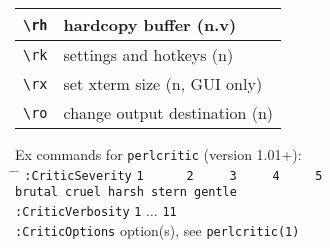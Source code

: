 \documentclass[oneside,10pt,landscape,DIV16]{scrartcl}
\begin{document}
\begin{multicols}{3}
\begin{center}
\begin{tabular}[]{|p{11mm}|p{58mm}|}
\hline \verb'\rh' & hardcopy buffer                 \hfill (n.v)\\
\hline \verb'\rk' & settings and hotkeys            \hfill (n)\\
\hline \verb'\rx' & set xterm size                  \hfill (n, {\tiny GUI only})\\
\hline \verb'\ro' & change output destination       \hfill (n)\\
\hline
\end{tabular}%
%
\begin{tabbing}
Ex commands for \verb'perlcritic' (version 1.01+):\\[.5ex]
\hspace{30mm} \= \hspace{50mm} \= \kill
\texttt{:CriticSeverity}  \> \texttt{1\ \ \ \ \ \ 2\ \ \ \ \ 3\ \ \ \ \ 4\ \ \ \ \ 5} \\
                         \> \texttt{brutal cruel harsh stern gentle} \\
\texttt{:CriticVerbosity} \> \texttt{1} $\ldots$ \texttt{11}\\
\texttt{:CriticOptions}   \> option(s), see \texttt{perlcritic(1)} 
\end{tabbing}
\end{center}
\end{multicols}
\end{document}
